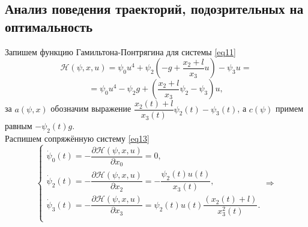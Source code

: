 \documentclass[a4paper,12pt]{article}
\begin{document}
\subsection{Анализ поведения траекторий, подозрительных на оптимальность} 
Запишем функцию Гамильтона-Понтрягина для системы \eqref{eq11} 
\[ \mathcal{H}(\psi, x, u) = \psi_0 u^4 +\psi_2\left(-g + \dfrac{x_2 + l}{x_3}u\right) - \psi_3u = \]
\[ = \psi_0 u^4 - \psi_2 g + \left(\dfrac{x_2 + l}{x_3}\psi_2 - \psi_3\right)u,\] 
за $a(\psi, x)$ обозначим выражение $\dfrac{x_2(t) + l}{x_3(t)}\psi_2(t) - \psi_3(t)$, а $c(\psi)$ примем равным $-\psi_2(t)g$. \\
Распишем сопряжённую систему \eqref{eq13}
$$\begin{cases}
	\dot{\psi}_0(t) = - \dfrac{\partial{\mathcal{H}(\psi, x, u)}}{\partial{x_0}} = 0, \\
	\dot{\psi}_2(t) = - \dfrac{\partial{\mathcal{H}(\psi, x, u)}}{\partial{x_2}} = - \dfrac{\psi_{2}(t)u(t)}{x_{3}(t)}, \\
	\dot{\psi}_3(t) = - \dfrac{\partial{\mathcal{H}(\psi, x, u)}}{\partial{x_3}} = \psi_2(t)u(t) \dfrac{(x_2(t) + l)}{x_3^2(t)}. \\
\end{cases} \Rightarrow$$
\end{document}
